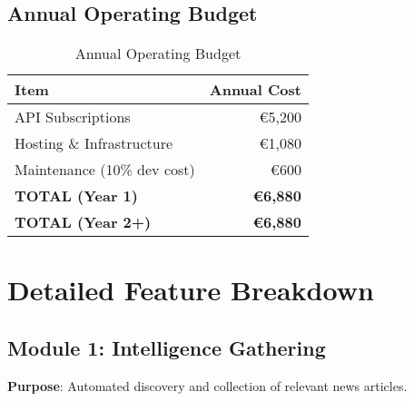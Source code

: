 \documentclass[11pt,a4paper]{article}
\begin{document}
\subsection{Annual Operating Budget}

\begin{table}[h]
\centering
\begin{tabular}{@{}lr@{}}
\toprule
\textbf{Item} & \textbf{Annual Cost} \\ \midrule
API Subscriptions & \euro 5,200 \\
Hosting \& Infrastructure & \euro 1,080 \\
Maintenance (10\% dev cost) & \euro 600 \\
\midrule
\textbf{TOTAL (Year 1)} & \textbf{\euro 6,880} \\
\textbf{TOTAL (Year 2+)} & \textbf{\euro 6,880} \\
\bottomrule
\end{tabular}
\caption{Annual Operating Budget}
\end{table}

\section{Detailed Feature Breakdown}

\subsection{Module 1: Intelligence Gathering}

\textbf{Purpose}: Automated discovery and collection of relevant news articles.
\end{document}
